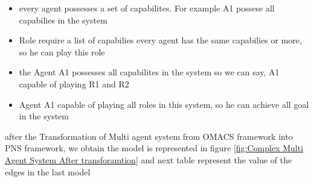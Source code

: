 \begin{itemize}

\newcommand{\localtextbulletone}{\textcolor{gray}{\raisebox{.45ex}{\rule{.6ex}{.6ex}}}}
\renewcommand{\labelitemi}{\localtextbulletone}
	\item every agent possesses a set of capabilites. For example A1 possese all capabilies in the system
	\item Role require a list of capabilies every agent has the same capabilies or more, so he can play this role 
	\item the Agent A1 possesses all capabilites in the system so we can say, A1 capable of playing R1 and R2
	\item Agent A1 capable of playing all roles in this system, so he can achieve all goal in the system
\end{itemize}
\vspace{0.7cm}
after the Transformation of Multi agent system from OMACS framework into PNS framework, we obtain the model is represented in figure \ref{fig:Complex Multi Agent System After transforamtion} 
and next table represent the value of the edges in the last model 


